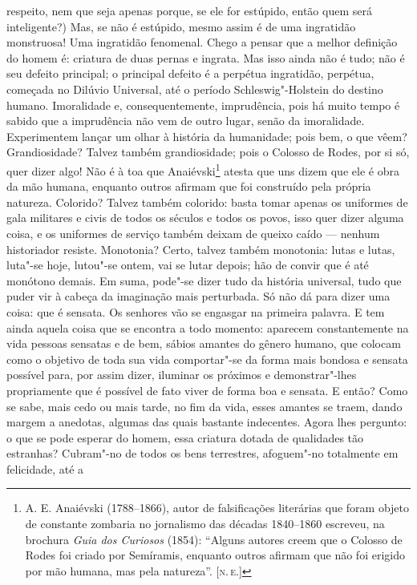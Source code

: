 respeito, nem que seja apenas porque, se ele for estúpido, então quem
será inteligente?) Mas, se não é estúpido, mesmo assim é de uma
ingratidão monstruosa! Uma ingratidão fenomenal. Chego a pensar que a
melhor definição do homem é: criatura de duas pernas e ingrata. Mas isso
ainda não é tudo; não é seu defeito principal; o principal defeito é a
perpétua ingratidão, perpétua, começada no Dilúvio Universal, até o
período Schleswig"-Holstein do destino humano. Imoralidade e,
consequentemente, imprudência, pois há muito tempo é sabido que a
imprudência não vem de outro lugar, senão da imoralidade. Experimentem
lançar um olhar à história da humanidade; pois bem, o que vêem?
Grandiosidade? Talvez também grandiosidade; pois o Colosso de Rodes, por
si só, quer dizer algo! Não é à toa que Anaiévski\footnote{A. E.
  Anaiévski (1788--1866), autor de falsificações literárias que foram
  objeto de constante zombaria no jornalismo das décadas 1840--1860
  escreveu, na brochura \emph{Guia dos Curiosos} (1854): ``Alguns
  autores creem que o Colosso de Rodes foi criado por Semíramis,
  enquanto outros afirmam que não foi erigido por mão humana, mas pela
  natureza''. {[}\textsc{n.\,e.}{]}} atesta que uns dizem que ele é obra da mão
humana, enquanto outros afirmam que foi construído pela própria
natureza. Colorido? Talvez também colorido: basta tomar apenas os
uniformes de gala militares e civis de todos os séculos e todos os
povos, isso quer dizer alguma coisa, e os uniformes de serviço também
deixam de queixo caído --- nenhum historiador resiste. Monotonia? Certo,
talvez também monotonia: lutas e lutas, luta"-se hoje, lutou"-se ontem,
vai se lutar depois; hão de convir que é até monótono demais. Em suma,
pode"-se dizer tudo da história universal, tudo que puder vir à cabeça da
imaginação mais perturbada. Só não dá para dizer uma coisa: que é
sensata. Os senhores vão se engasgar na primeira palavra. E tem ainda
aquela coisa que se encontra a todo momento: aparecem constantemente na
vida pessoas sensatas e de bem, sábios amantes do gênero humano, que
colocam como o objetivo de toda sua vida comportar"-se da forma mais
bondosa e sensata possível para, por assim dizer, iluminar os próximos e
demonstrar"-lhes propriamente que é possível de fato viver de forma boa e
sensata. E então? Como se sabe, mais cedo ou mais tarde, no fim da vida,
esses amantes se traem, dando margem a anedotas, algumas das quais
bastante indecentes. Agora lhes pergunto: o que se pode esperar do
homem, essa criatura dotada de qualidades tão estranhas? Cubram"-no de
todos os bens terrestres, afoguem"-no totalmente em felicidade, até a
